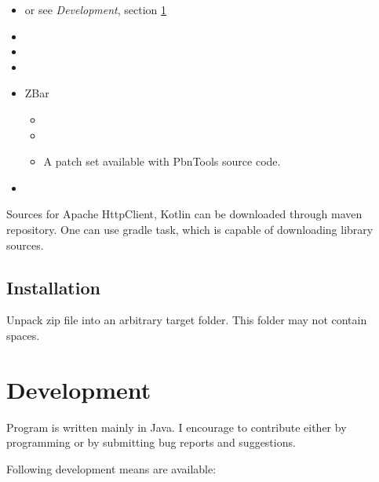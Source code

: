 \documentclass[polish,a4paper,11pt,oneside]{article}
\begin{document}
\begin{itemize}
\item
  \pbntoolsSourceLinks
  or see {\em Development}, section \ref{dev}
\item
\item
  \jsoupSourceLinks
\item
  \logbackSourceLinks
\item
  ZBar
  \begin{itemize}
  \item
    \zbarOldOrigSourceLinks
  \item
    \zbarOldSourceLinks
  \item
    A patch set available with PbnTools source code.
  \end{itemize}

\item

\end{itemize}

Sources for Apache HttpClient, Kotlin can be downloaded through maven repository.
One can use gradle task, which is capable of downloading library sources.

\subsection{Installation}
Unpack zip file into an arbitrary target folder.
This folder may not contain spaces.

\section{Development} \label{dev}

Program is written mainly in Java.
I encourage to contribute either by programming or by submitting bug reports and suggestions.

Following development means are available:
\end{document}
